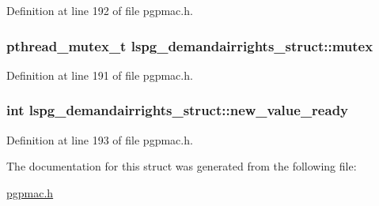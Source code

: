 Definition at line 192 of file pgpmac.\-h.

\hypertarget{structlspg__demandairrights__struct_a874970af767d4bb329f9764075b30096}{
\subsubsection[{mutex}]{\setlength{\rightskip}{0pt plus 5cm}pthread\-\_\-mutex\-\_\-t lspg\-\_\-demandairrights\-\_\-struct\-::mutex}}\label{structlspg__demandairrights__struct_a874970af767d4bb329f9764075b30096}


Definition at line 191 of file pgpmac.\-h.

\hypertarget{structlspg__demandairrights__struct_ad686c9a04d0c7e10b236c234eaf03ce7}{
\subsubsection[{new\-\_\-value\-\_\-ready}]{\setlength{\rightskip}{0pt plus 5cm}int lspg\-\_\-demandairrights\-\_\-struct\-::new\-\_\-value\-\_\-ready}}\label{structlspg__demandairrights__struct_ad686c9a04d0c7e10b236c234eaf03ce7}


Definition at line 193 of file pgpmac.\-h.



The documentation for this struct was generated from the following file\-:\begin{DoxyCompactItemize}
\item 
\hyperlink{pgpmac_8h}{pgpmac.\-h}\end{DoxyCompactItemize}

